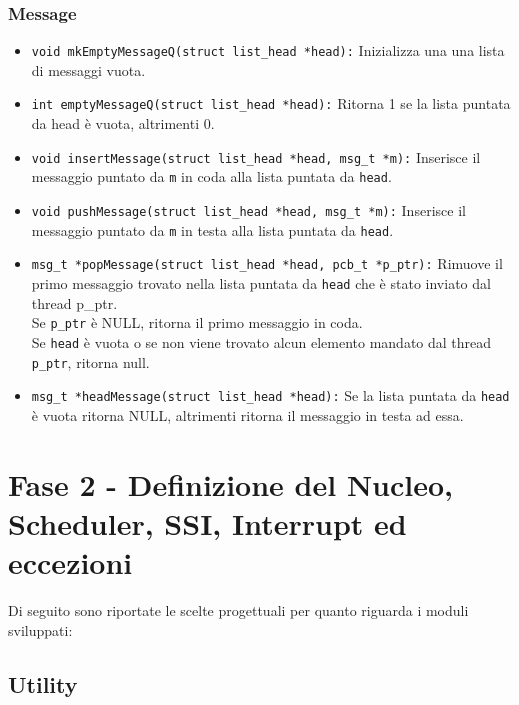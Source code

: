 \documentclass{article}
\begin{document}
\subsubsection{Message}
\begin{itemize}
    \item \texttt{void mkEmptyMessageQ(struct list\_head *head):}  Inizializza una una lista di messaggi vuota.
    \item \texttt{int emptyMessageQ(struct list\_head *head):} Ritorna 1 se la lista puntata da head è vuota, altrimenti 0.
    
    \item \texttt{void insertMessage(struct list\_head *head, msg\_t *m):} Inserisce il messaggio puntato da \texttt{m} in coda alla lista puntata da \texttt{head}.
    \item \texttt{void pushMessage(struct list\_head *head, msg\_t *m):} Inserisce il messaggio puntato da \texttt{m} in testa alla lista puntata da \texttt{head}.
    \item \texttt{msg\_t *popMessage(struct list\_head *head, pcb\_t *p\_ptr):} Rimuove il primo messaggio trovato nella lista puntata da \texttt{head} che è stato inviato dal thread p\_ptr.\\
    Se \texttt{p\_ptr} è NULL, ritorna il primo messaggio in coda. \\
    Se \texttt{head} è vuota o se non viene trovato alcun elemento mandato dal thread \texttt{p\_ptr}, ritorna null.
    \item \texttt{msg\_t *headMessage(struct list\_head *head):} Se la lista puntata da \texttt{head} è vuota ritorna NULL, altrimenti ritorna il messaggio in testa ad essa.
\end{itemize}

\newpage

\section{Fase 2 - Definizione del Nucleo, Scheduler, SSI, Interrupt ed eccezioni}
Di seguito sono riportate le scelte progettuali per quanto riguarda i moduli sviluppati:

\subsection{Utility}
\end{document}

